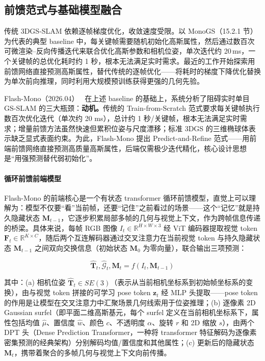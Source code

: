 \subsection{前馈范式与基础模型融合}

传统 3DGS-SLAM 依赖逐帧梯度优化，收敛速度受限。以 MonoGS（15.2.1 节）为代表的典型 baseline 中，每关键帧需要随机初始化高斯属性，然后通过数百次可微渲染--反向传播迭代来联合优化高斯参数和相机位姿，单次迭代约 20\,ms，一个关键帧的总优化耗时约 1 秒，根本无法满足实时需求。最近的工作开始探索用前馈网络直接预测高斯属性，替代传统的逐帧优化——将耗时的梯度下降优化替换为单次前向推理，同时利用大规模预训练获得更强的几何先验。

Flash-Mono（2026.04）~\cite{2604_03092} 在上述 baseline 的基础上，系统分析了阻碍实时单目 GS-SLAM 的三大瓶颈：\textbf{动机。}传统的 Train-from-Scratch 范式要求每关键帧执行数百次优化迭代（单次约 20 ms），总计约 1 秒/关键帧，根本无法满足实时需求；增量前馈方法虽然快速但累积位姿与尺度漂移；标准 3DGS 的三维椭球体表示缺乏显式表面约束。为此，Flash-Mono 提出 Predict-and-Refine 范式——用前端前馈网络直接预测高质量高斯属性，后端仅需极少迭代精化，核心设计思想是``用强预测替代弱初始化''。

\paragraph{循环前馈前端模型}Flash-Mono 的前端核心是一个有状态 transformer 循环前馈模型，直觉上可以理解为：模型不仅要``看''当前帧，还要``记住''之前看过的场景——这个``记忆''就是持久隐藏状态 $\mathbf{M}_{t-1}$，它逐步积累局部多帧的几何与视觉上下文，作为跨帧信息传递的桥梁。具体来说，每帧 RGB 图像 $I_t \in \mathbb{R}^{H \times W \times 3}$ 经 ViT 编码器提取视觉 token $\mathbf{F}_t \in \mathbb{R}^{K \times C}$，随后两个互连解码器通过交叉注意力在当前视觉 token 与持久隐藏状态 $\mathbf{M}_{t-1}$ 之间双向交换信息（初始状态 $\mathbf{M}_0$ 为零向量），联合输出三项预测：

\begin{equation}
\hat{\mathbf{T}}_t, \hat{\mathcal{G}}_t, \mathbf{M}_t = f(I_t, \mathbf{M}_{t-1})
\end{equation}

其中：(a) 相机位姿 $\hat{\mathbf{T}}_t \in SE(3)$（表示从当前相机坐标系到初始帧坐标系的变换），由与视觉 token 拼接的可学习 pose token $\mathbf{z}_t$ 经 MLP 头提取——pose token 的作用是让模型在交叉注意力中汇聚场景几何线索用于位姿推理；(b) 逐像素 2D Gaussian surfel（即平面二维高斯基元，每个 surfel 定义在当前相机坐标系下，属性包括均值 $\hat{\mu}$、置信度 $\hat{w}$、颜色 $c$、不透明度 $\alpha$、旋转 $r$ 和 2D 缩放 $s$），由两个 DPT 头（Dense Prediction Transformer，一种将 transformer 特征解码为逐像素密集预测的经典架构）分别解码均值/置信度和其他属性；(c) 更新后的隐藏状态 $\mathbf{M}_t$，携带着聚合的多帧几何与视觉上下文向前传播。


